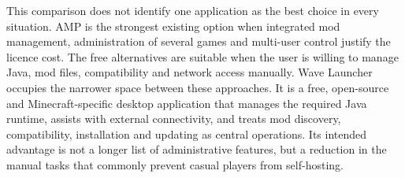 This comparison does not identify one application as the best choice in every situation. AMP is the strongest existing option when integrated mod management, administration of several games and multi-user control justify the licence cost. The free alternatives are suitable when the user is willing to manage Java, mod files, compatibility and network access manually. Wave Launcher occupies the narrower space between these approaches. It is a free, open-source and Minecraft-specific desktop application that manages the required Java runtime, assists with external connectivity, and treats mod discovery, compatibility, installation and updating as central operations. Its intended advantage is not a longer list of administrative features, but a reduction in the manual tasks that commonly prevent casual players from self-hosting.
